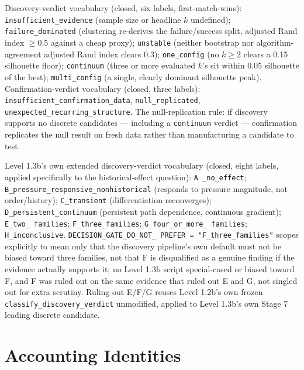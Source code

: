 Discovery-verdict vocabulary (closed, six labels, first-match-wins):
\texttt{insufficient\_evidence} (sample size or headline $k$ undefined);
\texttt{failure\_dominated} (clustering re-derives the failure/success
split, adjusted Rand index $\geq0.5$ against a cheap proxy);
\texttt{unstable} (neither bootstrap nor algorithm-agreement adjusted Rand
index clears 0.3); \texttt{one\_config} (no $k\geq2$ clears a 0.15
silhouette floor); \texttt{continuum} (three or more evaluated $k$'s sit
within 0.05 silhouette of the best); \texttt{multi\_config} (a single,
clearly dominant silhouette peak). Confirmation-verdict vocabulary (closed,
three labels): \texttt{insufficient\_confirmation\_data},
\texttt{null\_replicated}, \texttt{unexpected\_recurring\_structure}. The
null-replication rule: if discovery supports no discrete candidates
--- including a \texttt{continuum} verdict --- confirmation replicates the
null result on fresh data rather than manufacturing a candidate to test.

Level 1.3b's own extended discovery-verdict vocabulary (closed, eight
labels, applied specifically to the historical-effect question): \texttt{A%
\_no\_effect}; \texttt{B\_pressure\_responsive\_nonhistorical} (responds to
pressure magnitude, not order/history); \texttt{C\_transient}
(differentiation reconverges); \texttt{D\_persistent\_continuum}
(persistent path dependence, continuous gradient); \texttt{E\_two\_%
families}; \texttt{F\_three\_families}; \texttt{G\_four\_or\_more\_%
families}; \texttt{H\_inconclusive}. \texttt{DECISION\_GATE\_DO\_NOT\_%
PREFER = "F\_three\_families"} scopes explicitly to mean only that the
discovery pipeline's own default must not be biased toward three families,
not that F is disqualified as a genuine finding if the evidence actually
supports it; no Level 1.3b script special-cased or biased toward F, and
F was ruled out on the same evidence that ruled out E and G, not singled
out for extra scrutiny. Ruling out E/F/G reuses Level 1.2b's own frozen
\texttt{classify\_discovery\_verdict} unmodified, applied to Level 1.3b's
own Stage 7 leading discrete candidate.

\clearpage
\section{Accounting Identities}
\label{sec:appendix-accounting}

